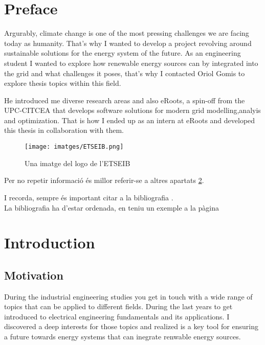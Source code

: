 \documentclass[a4paper,11pt, titlepage, twoside]{article}
\begin{document}
\printnomenclature
\section{Preface}

Argurably, climate change is one of the most pressing challenges we are facing today as humanity.
That's why I wanted to develop a project revolving around sustainable solutions for the 
energy system of the future. As an engineering student I wanted to explore how renewable 
energy sources can by integrated into the grid and what challenges it poses, that's why I 
contacted Oriol Gomis to explore thesis topics within this field.\par
He introduced me diverse research areas and also eRoots, a spin-off from the UPC-CITCEA
that develops software solutions for modern grid modelling,analyis and optimization. That is
how I ended up as an intern at eRoots and developed this thesis in collaboration with them.


\begin{figure}[H] %
	\centering
	\texttt{[image: imatges/ETSEIB.png]}
	\caption{Una imatge del logo de l'ETSEIB}
	\label{fig:ETSEIB} %
\end{figure}

Per no repetir informació és millor referir-se a altres apartats \ref{introducció}.\par
I recorda, sempre és important citar a la bibliografia \cite{Etiqueta}.\\
La bibliografia ha d'estar ordenada, en teniu un exemple a la pàgina \pageref{biblio}
\section{Introduction}\label{introducció}

\subsection{Motivation}

During the industrial engineering studies you get in touch with a wide range of topics that can be applied
to different fields. During the last years to get introduced to electrical engineering fundamentals and its 
applications. I discovered a deep interests for those topics and realized is a key tool for ensuring a future towards
energy systems that can inegrate renwable energy sources.\par
\end{document}
